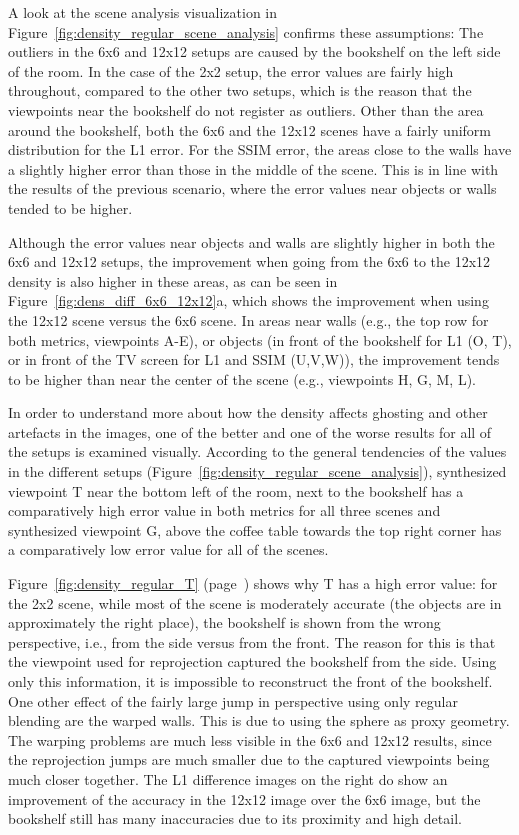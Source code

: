 A look at the scene analysis visualization in Figure~\ref{fig:density_regular_scene_analysis} confirms these assumptions: The outliers in the 6x6 and 12x12 setups are caused by the bookshelf on the left side of the room. In the case of the 2x2 setup, the error values are fairly high throughout, compared to the other two setups, which is the reason that the viewpoints near the bookshelf do not register as outliers. Other than the area around the bookshelf, both the 6x6 and the 12x12 scenes have a fairly uniform distribution for the L1 error. For the SSIM error, the areas close to the walls have a slightly higher error than those in the middle of the scene. This is in line with the results of the previous scenario, where the error values near objects or walls tended to be higher.

Although the error values near objects and walls are slightly higher in both the 6x6 and 12x12 setups, the improvement when going from the 6x6 to the 12x12 density is also higher in these areas, as can be seen in Figure~\ref{fig:dens_diff_6x6_12x12}a, which shows the improvement when using the 12x12 scene versus the 6x6 scene. In areas near walls (e.g., the top row for both metrics, viewpoints A-E), or objects (in front of the bookshelf for L1 (O, T), or in front of the TV screen for L1 and SSIM (U,V,W)), the improvement tends to be higher than near the center of the scene (e.g., viewpoints H, G, M, L).

In order to understand more about how the density affects ghosting and other artefacts in the images, one of the better and one of the worse results for all of the setups is examined visually. According to the general tendencies of the values in the different setups (Figure~\ref{fig:density_regular_scene_analysis}), synthesized viewpoint T near the bottom left of the room, next to the bookshelf has a comparatively high error value in both metrics for all three scenes and synthesized viewpoint G, above the coffee table towards the top right corner has a comparatively low error value for all of the scenes.

Figure~\ref{fig:density_regular_T} (page~\pageref{fig:density_regular_T}) shows why T has a high error value: for the 2x2 scene, while most of the scene is moderately accurate (the objects are in approximately the right place), the bookshelf is shown from the wrong perspective, i.e., from the side versus from the front. The reason for this is that the viewpoint used for reprojection captured the bookshelf from the side. Using only this information, it is impossible to reconstruct the front of the bookshelf. One other effect of the fairly large jump in perspective using only regular blending are the warped walls. This is due to using the sphere as proxy geometry. The warping problems are much less visible in the 6x6 and 12x12 results, since the reprojection jumps are much smaller due to the captured viewpoints being much closer together. The L1 difference images on the right do show an improvement of the accuracy in the 12x12 image over the 6x6 image, but the bookshelf still has many inaccuracies due to its proximity and high detail.


